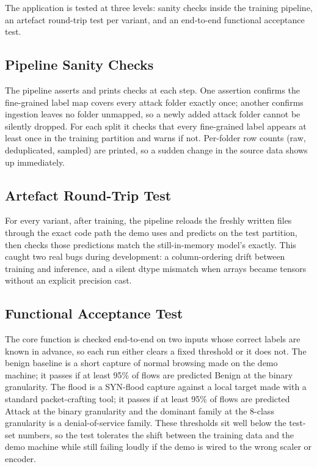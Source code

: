 \par The application is tested at three levels: sanity checks inside the training pipeline, an artefact round-trip test per variant, and an end-to-end functional acceptance test.

\subsection{Pipeline Sanity Checks}
\label{subsec:notebook_sanity}

\par The pipeline asserts and prints checks at each step. One assertion confirms the fine-grained label map covers every attack folder exactly once; another confirms ingestion leaves no folder unmapped, so a newly added attack folder cannot be silently dropped. For each split it checks that every fine-grained label appears at least once in the training partition and warns if not. Per-folder row counts (raw, deduplicated, sampled) are printed, so a sudden change in the source data shows up immediately.

\subsection{Artefact Round-Trip Test}
\label{subsec:roundtrip_test}

\par For every variant, after training, the pipeline reloads the freshly written files through the exact code path the demo uses and predicts on the test partition, then checks those predictions match the still-in-memory model's exactly. This caught two real bugs during development: a column-ordering drift between training and inference, and a silent dtype mismatch when arrays became tensors without an explicit precision cast.

\subsection{Functional Acceptance Test}
\label{subsec:f1_functional_test}

\par The core function is checked end-to-end on two inputs whose correct labels are known in advance, so each run either clears a fixed threshold or it does not. The benign baseline is a short capture of normal browsing made on the demo machine; it passes if at least 95\% of flows are predicted Benign at the binary granularity. The flood is a SYN-flood capture against a local target made with a standard packet-crafting tool; it passes if at least 95\% of flows are predicted Attack at the binary granularity and the dominant family at the 8-class granularity is a denial-of-service family. These thresholds sit well below the test-set numbers, so the test tolerates the shift between the training data and the demo machine while still failing loudly if the demo is wired to the wrong scaler or encoder.

